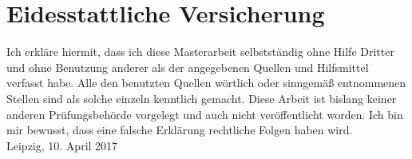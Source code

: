 \chapter*{Eidesstattliche Versicherung}

Ich erkläre hiermit, dass ich diese Masterarbeit selbstständig ohne Hilfe Dritter und ohne Benutzung anderer als der angegebenen Quellen und Hilfsmittel verfasst habe. Alle den benutzten Quellen wörtlich oder sinngemäß entnommenen Stellen sind als solche einzeln kenntlich gemacht. Diese Arbeit ist bislang keiner anderen Prüfungsbehörde vorgelegt und auch nicht veröffentlicht worden. Ich bin mir bewusst, dass eine falsche Erklärung rechtliche Folgen haben wird.
\\[3cm]
Leipzig, 10. April 2017